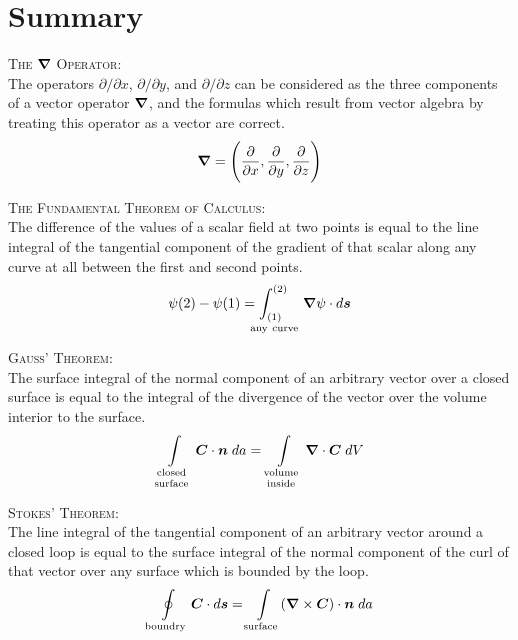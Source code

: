 \section{Summary}

\textsc{The $\boldsymbol{\nabla}$ Operator}:\\
The operators $\partial/\partial x$, $\partial/\partial y$, and $\partial/\partial z$
can be considered as the three components of a vector operator $\boldsymbol{\nabla}$,
and the formulas which result from vector algebra by treating this operator
as a vector are correct.
\begin{equation*}
  \boldsymbol{\nabla} = \Bigg( \frac{\partial }{\partial x} , \frac{\partial }{\partial y} , \frac{\partial }{\partial z} \Bigg)
\end{equation*}

\textsc{The Fundamental Theorem of Calculus}:\\
The difference of the values of a scalar field at two points is equal to the
line integral of the tangential component of the gradient of that scalar along
any curve at all between the first and second points.
\begin{equation}
  \psi(2) - \psi(1) = \int
  _{\hspace{-3ex}\raisebox{-1ex}{\mbox{$\genfrac{}{}{0pt}{1}{(1)}{\mathrm{any\ curve}}$}}}
  ^{(2)} \grad \psi \cdot d\bv{s} 
\end{equation}

\textsc{Gauss' Theorem}:\\
The surface integral of the normal component of an arbitrary vector
over a closed surface is equal to the integral of the divergence of the vector over
the volume interior to the surface.
\begin{equation}
  \int\limits_{\genfrac{}{}{0pt}{1}{\mathrm{closed}}{\mathrm{surface}}}
  \bv{C} \cdot \bv{n} \; da =
  \int\limits_{\genfrac{}{}{0pt}{1}{\mathrm{volume}}{\mathrm{inside}}}
  \grad \cdot \bv{C} \; dV
\end{equation}

\textsc{Stokes' Theorem}:\\
The line integral of the tangential component of an arbitrary vector
around a closed loop is equal to the surface integral of the normal component
of the curl of that vector over any surface which is bounded by the loop.
\begin{equation}
  \oint\limits_{\mathrm{boundry}}
  \boldsymbol{C} \cdot d\boldsymbol{s} = 
  \int\limits_{\mathrm{surface}}
  (\boldsymbol{\nabla} \times \boldsymbol{C}) \cdot \boldsymbol{n} \; da
\end{equation}

